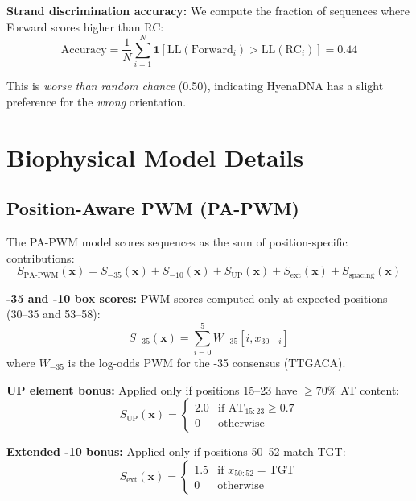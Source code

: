 \documentclass{article}
\newcommand{\LL}{\text{LL}}
\begin{document}
\textbf{Strand discrimination accuracy:} We compute the fraction of sequences where Forward scores higher than RC:
\begin{equation}
\text{Accuracy} = \frac{1}{N}\sum_{i=1}^{N} \mathbf{1}[\LL(\text{Forward}_i) > \LL(\text{RC}_i)] = 0.44
\end{equation}

This is \textit{worse than random chance} (0.50), indicating HyenaDNA has a slight preference for the \textit{wrong} orientation.

\section{Biophysical Model Details}
\label{app:biophysical}

\subsection{Position-Aware PWM (PA-PWM)}

The PA-PWM model scores sequences as the sum of position-specific contributions:
\begin{equation}
S_{\text{PA-PWM}}(\mathbf{x}) = S_{-35}(\mathbf{x}) + S_{-10}(\mathbf{x}) + S_{\text{UP}}(\mathbf{x}) + S_{\text{ext}}(\mathbf{x}) + S_{\text{spacing}}(\mathbf{x})
\end{equation}

\textbf{-35 and -10 box scores:} PWM scores computed only at expected positions (30--35 and 53--58):
\begin{equation}
S_{-35}(\mathbf{x}) = \sum_{i=0}^{5} W_{-35}[i, x_{30+i}]
\end{equation}
where $W_{-35}$ is the log-odds PWM for the -35 consensus (TTGACA).

\textbf{UP element bonus:} Applied only if positions 15--23 have $\geq$70\% AT content:
\begin{equation}
S_{\text{UP}}(\mathbf{x}) = \begin{cases} 2.0 & \text{if AT}_{15:23} \geq 0.7 \\ 0 & \text{otherwise} \end{cases}
\end{equation}

\textbf{Extended -10 bonus:} Applied only if positions 50--52 match TGT:
\begin{equation}
S_{\text{ext}}(\mathbf{x}) = \begin{cases} 1.5 & \text{if } x_{50:52} = \text{TGT} \\ 0 & \text{otherwise} \end{cases}
\end{equation}
\end{document}
